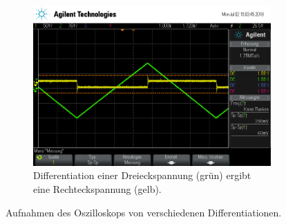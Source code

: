 \begin{figure}[ht]
\begin{subfigure}[]{\textwidth}
    \includegraphics[height=0.28\textheight]{data/scope_267.png}
    \caption{Differentiation einer Dreieckspannung (grün) ergibt eine Rechteckspannung (gelb).}
    \label{subfig:dif_dreieck}
  \end{subfigure}
  \caption{Aufnahmen des Oszilloskops von verschiedenen Differentiationen.}
  \label{fig:differentiationen}
\end{figure}

